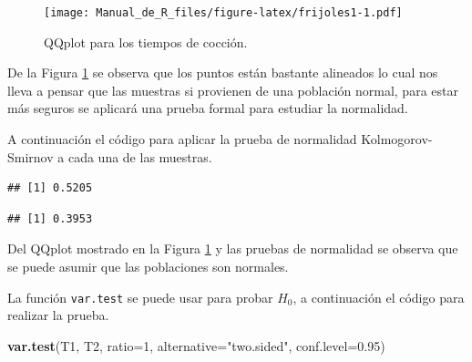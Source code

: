 \documentclass[10pt,]{krantz}
\makeatletter
\newenvironment{Shaded}{\begin{snugshade}}{\end{snugshade}}
\newcommand{\KeywordTok}[1]{\textcolor[rgb]{0.13,0.29,0.53}{\textbf{#1}}}
\newcommand{\DataTypeTok}[1]{\textcolor[rgb]{0.13,0.29,0.53}{#1}}
\newcommand{\DecValTok}[1]{\textcolor[rgb]{0.00,0.00,0.81}{#1}}
\newcommand{\FloatTok}[1]{\textcolor[rgb]{0.00,0.00,0.81}{#1}}
\newcommand{\StringTok}[1]{\textcolor[rgb]{0.31,0.60,0.02}{#1}}
\newcommand{\CommentTok}[1]{\textcolor[rgb]{0.56,0.35,0.01}{\textit{#1}}}
\newcommand{\OperatorTok}[1]{\textcolor[rgb]{0.81,0.36,0.00}{\textbf{#1}}}
\newcommand{\NormalTok}[1]{#1}
\newenvironment{kframe}{%
\medskip{}
\setlength{\fboxsep}{.8em}
 \def\at@end@of@kframe{}%
 \ifinner\ifhmode%
  \def\at@end@of@kframe{\end{minipage}}%
  \begin{minipage}{\columnwidth}%
 \fi\fi%
 \def\FrameCommand##1{\hskip\@totalleftmargin \hskip-\fboxsep
 \colorbox{shadecolor}{##1}\hskip-\fboxsep
     \hskip-\linewidth \hskip-\@totalleftmargin \hskip\columnwidth}%
 \MakeFramed {\advance\hsize-\width
   \@totalleftmargin\z@ \linewidth\hsize
   \@setminipage}}%
 {\par\unskip\endMakeFramed%
 \at@end@of@kframe}
\renewenvironment{Shaded}{\begin{kframe}}{\end{kframe}}
\makeatother
\begin{document}
\begin{figure}
\centering
\texttt{[image: Manual\_de\_R\_files/figure-latex/frijoles1-1.pdf]}
\caption{\label{fig:frijoles1}QQplot para los tiempos de cocción.}
\end{figure}

De la Figura \ref{fig:frijoles1} se observa que los puntos están
bastante alineados lo cual nos lleva a pensar que las muestras si
provienen de una población normal, para estar más seguros se aplicará
una prueba formal para estudiar la normalidad.

A continuación el código para aplicar la prueba de normalidad
Kolmogorov-Smirnov a cada una de las muestras.

\begin{Shaded}
\end{Shaded}

\begin{verbatim}
## [1] 0.5205
\end{verbatim}

\begin{Shaded}
\end{Shaded}

\begin{verbatim}
## [1] 0.3953
\end{verbatim}

Del QQplot mostrado en la Figura \ref{fig:frijoles1} y las pruebas de
normalidad se observa que se puede asumir que las poblaciones son
normales.

La función \texttt{var.test} se puede usar para probar \(H_0\), a
continuación el código para realizar la prueba.

\begin{Shaded}
\begin{Highlighting}[]
\KeywordTok{var.test}\NormalTok{(T1, T2, }\DataTypeTok{ratio=}\DecValTok{1}\NormalTok{, }\DataTypeTok{alternative=}\StringTok{"two.sided"}\NormalTok{,}
         \DataTypeTok{conf.level=}\FloatTok{0.95}\NormalTok{)}
\end{Highlighting}
\end{Shaded}
\end{document}
